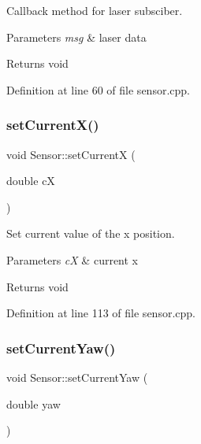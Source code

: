 Callback method for laser subsciber. 


\begin{DoxyParams}{Parameters}
{\em msg} & laser data \\
\hline
\end{DoxyParams}
\begin{DoxyReturn}{Returns}
void 
\end{DoxyReturn}


Definition at line 60 of file sensor.\+cpp.

\mbox{\label{class_sensor_a380fab1afde78a51e06ae1498164bfc7}} 
\subsubsection{\texorpdfstring{set\+Current\+X()}{setCurrentX()}}
{\footnotesize\ttfamily void Sensor\+::set\+CurrentX (\begin{DoxyParamCaption}\item[{double}]{cX }\end{DoxyParamCaption})}



Set current value of the x position. 


\begin{DoxyParams}{Parameters}
{\em cX} & current x \\
\hline
\end{DoxyParams}
\begin{DoxyReturn}{Returns}
void 
\end{DoxyReturn}


Definition at line 113 of file sensor.\+cpp.

\mbox{\label{class_sensor_a725c0cc64bdf279e35f9ca4e96d8235d}} 
\subsubsection{\texorpdfstring{set\+Current\+Yaw()}{setCurrentYaw()}}
{\footnotesize\ttfamily void Sensor\+::set\+Current\+Yaw (\begin{DoxyParamCaption}\item[{double}]{yaw }\end{DoxyParamCaption})}



